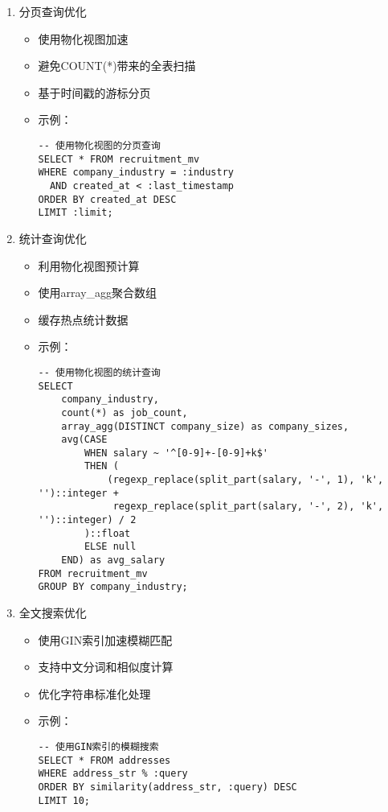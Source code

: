\begin{enumerate}
  \item 分页查询优化
  \begin{itemize}
    \item 使用物化视图加速
    \item 避免COUNT(*)带来的全表扫描
    \item 基于时间戳的游标分页
    \item 示例：
    \begin{verbatim}
-- 使用物化视图的分页查询
SELECT * FROM recruitment_mv
WHERE company_industry = :industry
  AND created_at < :last_timestamp
ORDER BY created_at DESC
LIMIT :limit;
    \end{verbatim}
  \end{itemize}

  \item 统计查询优化
  \begin{itemize}
    \item 利用物化视图预计算
    \item 使用array\_agg聚合数组
    \item 缓存热点统计数据
    \item 示例：
    \begin{verbatim}
-- 使用物化视图的统计查询
SELECT 
    company_industry,
    count(*) as job_count,
    array_agg(DISTINCT company_size) as company_sizes,
    avg(CASE 
        WHEN salary ~ '^[0-9]+-[0-9]+k$' 
        THEN (
            (regexp_replace(split_part(salary, '-', 1), 'k', '')::integer + 
             regexp_replace(split_part(salary, '-', 2), 'k', '')::integer) / 2
        )::float 
        ELSE null 
    END) as avg_salary
FROM recruitment_mv
GROUP BY company_industry;
    \end{verbatim}
  \end{itemize}

  \item 全文搜索优化
  \begin{itemize}
    \item 使用GIN索引加速模糊匹配
    \item 支持中文分词和相似度计算
    \item 优化字符串标准化处理
    \item 示例：
    \begin{verbatim}
-- 使用GIN索引的模糊搜索
SELECT * FROM addresses
WHERE address_str % :query
ORDER BY similarity(address_str, :query) DESC
LIMIT 10;
    \end{verbatim}
  \end{itemize}


\end{enumerate}
